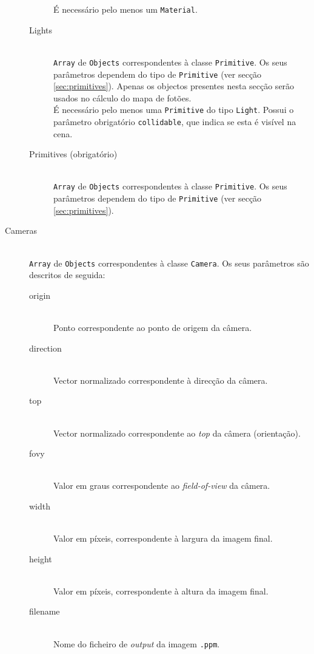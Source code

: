 \documentclass[a4paper]{article}
\begin{document}
\begin{description}
\begin{description}
				É necessário pelo menos um \texttt{Material}.
			\item[Lights] \hfill \\
				\texttt{Array} de \texttt{Objects} correspondentes à classe \texttt{Primitive}.
				Os seus parâmetros dependem do tipo de \texttt{Primitive} (ver secção \ref{sec:primitives}).
				Apenas os objectos presentes nesta secção serão usados no cálculo do mapa de fotões. \\
				É necessário pelo menos uma \texttt{Primitive} do tipo \texttt{Light}.
				Possui o parâmetro obrigatório \texttt{collidable}, que indica se esta é visível na cena.
			\item[Primitives (obrigatório)] \hfill \\
				\texttt{Array} de \texttt{Objects} correspondentes à classe \texttt{Primitive}.
				Os seus parâmetros dependem do tipo de \texttt{Primitive} (ver secção \ref{sec:primitives}).
		\end{description}
	\item[Cameras] \hfill \\
		\texttt{Array} de \texttt{Objects} correspondentes à classe \texttt{Camera}.
		Os seus parâmetros são descritos de seguida:
		\begin{description}
			\item[origin] \hfill \\
				Ponto correspondente ao ponto de origem da câmera.
			\item[direction] \hfill \\
				Vector normalizado correspondente à direcção da câmera.
			\item[top] \hfill \\
				Vector normalizado correspondente ao \emph{top} da câmera (orientação).
			\item[fovy] \hfill \\
				Valor em graus correspondente ao \textit{field-of-view} da câmera.
			\item[width] \hfill \\
				Valor em píxeis, correspondente à largura da imagem final.
			\item[height] \hfill \\
				Valor em píxeis, correspondente à altura da imagem final.
			\item[filename] \hfill \\
				Nome do ficheiro de \textit{output} da imagem \texttt{.ppm}.
		\end{description}


\end{description}
\end{document}
